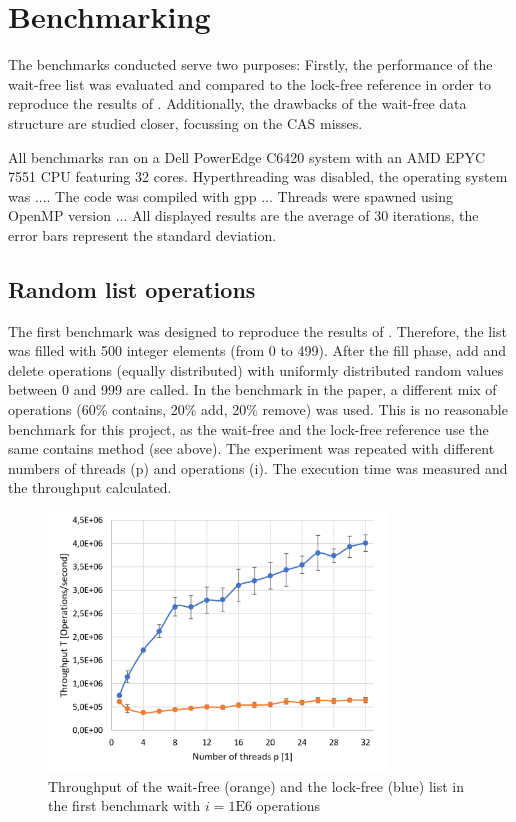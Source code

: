\documentclass[a4paper, 12pt]{article}
\begin{document}
\section{Benchmarking}

The benchmarks conducted serve two purposes: Firstly, the performance of the wait-free list was evaluated and compared to the lock-free reference in order to reproduce the results of \cite{timnat12}. Additionally, the drawbacks of the wait-free data structure are studied closer, focussing on the CAS misses. 


All benchmarks ran on a Dell PowerEdge C6420 system with an AMD EPYC 7551 CPU featuring 32 cores. Hyperthreading was disabled, the operating system was .... The code was compiled with gpp ... Threads were spawned using OpenMP version ... All displayed results are the average of 30 iterations, the error bars represent the standard deviation.

\subsection{Random list operations}
The first benchmark was designed to reproduce the results of \cite{timnat12}. Therefore, the list was filled with 500 integer elements (from 0 to 499). After the fill phase, add and delete operations (equally distributed) with uniformly distributed random values between 0 and 999 are called. In the benchmark in the paper, a different mix of operations (60\% contains, 20\% add, 20\% remove) was used. This is no reasonable benchmark for this project, as the wait-free and the lock-free reference use the same contains method (see above). The experiment was repeated with different numbers of threads (p) and operations (i). The execution time was measured and the throughput calculated.

\begin{figure} [h!]
\includegraphics[width=9cm]{tp_vs_p.png}
\centering
\caption{Throughput of the wait-free (orange) and the lock-free (blue) list in the first benchmark with $i = 1\mathrm{E}6$ operations}
\label{tp_p}
\end{figure}
\end{document}
